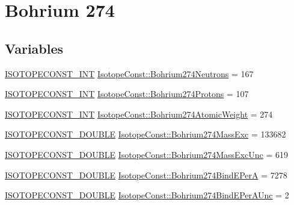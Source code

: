 \hypertarget{group___isotope_const-_bohrium-_bh274}{}\section{Bohrium 274}
\label{group___isotope_const-_bohrium-_bh274}
\subsection*{Variables}
\begin{DoxyCompactItemize}
\item 
\mbox{\hyperlink{group___isotope_const-_macros_ga5f18360b3e99483a35c32d789e62621c}{I\+S\+O\+T\+O\+P\+E\+C\+O\+N\+S\+T\+\_\+\+I\+NT}} \mbox{\hyperlink{group___isotope_const-_bohrium-_bh274_ga93df4617e5ce6229b935ad4705cdb9c3}{Isotope\+Const\+::\+Bohrium274\+Neutrons}} = 167
\item 
\mbox{\hyperlink{group___isotope_const-_macros_ga5f18360b3e99483a35c32d789e62621c}{I\+S\+O\+T\+O\+P\+E\+C\+O\+N\+S\+T\+\_\+\+I\+NT}} \mbox{\hyperlink{group___isotope_const-_bohrium-_bh274_gaaf32b579bc87ea79107d012888f8ae32}{Isotope\+Const\+::\+Bohrium274\+Protons}} = 107
\item 
\mbox{\hyperlink{group___isotope_const-_macros_ga5f18360b3e99483a35c32d789e62621c}{I\+S\+O\+T\+O\+P\+E\+C\+O\+N\+S\+T\+\_\+\+I\+NT}} \mbox{\hyperlink{group___isotope_const-_bohrium-_bh274_ga597645e36663da9833b3b1d3a6036f75}{Isotope\+Const\+::\+Bohrium274\+Atomic\+Weight}} = 274
\item 
\mbox{\hyperlink{group___isotope_const-_macros_ga8f45a7272ce02c0b4c65c44636ed719a}{I\+S\+O\+T\+O\+P\+E\+C\+O\+N\+S\+T\+\_\+\+D\+O\+U\+B\+LE}} \mbox{\hyperlink{group___isotope_const-_bohrium-_bh274_ga08c4fbcbe0bc7d0f64fc4e1334bc759c}{Isotope\+Const\+::\+Bohrium274\+Mass\+Exc}} = 133682
\item 
\mbox{\hyperlink{group___isotope_const-_macros_ga8f45a7272ce02c0b4c65c44636ed719a}{I\+S\+O\+T\+O\+P\+E\+C\+O\+N\+S\+T\+\_\+\+D\+O\+U\+B\+LE}} \mbox{\hyperlink{group___isotope_const-_bohrium-_bh274_gaa0bdca50c23599e53c08292c92d09e20}{Isotope\+Const\+::\+Bohrium274\+Mass\+Exc\+Unc}} = 619
\item 
\mbox{\hyperlink{group___isotope_const-_macros_ga8f45a7272ce02c0b4c65c44636ed719a}{I\+S\+O\+T\+O\+P\+E\+C\+O\+N\+S\+T\+\_\+\+D\+O\+U\+B\+LE}} \mbox{\hyperlink{group___isotope_const-_bohrium-_bh274_gae4b9549020d55c45a4a4342a728972a3}{Isotope\+Const\+::\+Bohrium274\+Bind\+E\+PerA}} = 7278
\item 
\mbox{\hyperlink{group___isotope_const-_macros_ga8f45a7272ce02c0b4c65c44636ed719a}{I\+S\+O\+T\+O\+P\+E\+C\+O\+N\+S\+T\+\_\+\+D\+O\+U\+B\+LE}} \mbox{\hyperlink{group___isotope_const-_bohrium-_bh274_ga250575cee093642d9efc6ac2d885040f}{Isotope\+Const\+::\+Bohrium274\+Bind\+E\+Per\+A\+Unc}} = 2

\end{DoxyCompactItemize}

